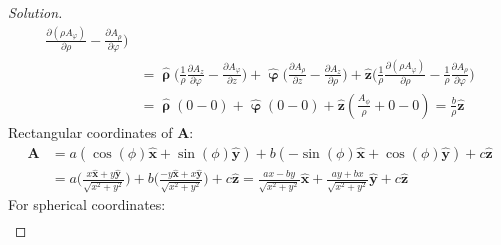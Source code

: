 \begin{proof}[Solution]
\begin{align*}
                        \frac{\partial(\rho{A_{\varphi}})}
                             {\partial\rho}
                        -\frac{\partial{A_{\rho}}}
                              {\partial\varphi}
                    \bigg)\\
                    &=\hat{\boldsymbol{\uprho}}\bigg(
                        \frac{1}{\rho}
                        \frac{\partial{A_{z}}}{\partial\varphi}
                        -\frac{\partial{A_{\varphi}}}
                              {\partial{z}}
                    \bigg)
                    +\hat{\boldsymbol{\upvarphi}}\bigg(
                        \frac{\partial{A_{\rho}}}{\partial{z}}
                        -\frac{\partial{A_{z}}}{\partial\rho}
                    \bigg)
                    +\hat{\mathbf{z}}\bigg(
                        \frac{1}{\rho}
                        \frac{\partial(\rho{A_{\varphi}})}
                             {\partial\rho}
                        -\frac{1}{\rho}
                        \frac{\partial{A_{\rho}}}
                             {\partial\varphi}
                    \bigg)\\
                    &=\hat{\boldsymbol{\uprho}}(0-0)
                     +\hat{\boldsymbol{\upvarphi}}(0-0)
                     +\hat{\mathbf{z}}(\frac{A_{\phi}}{\rho}+0-0)
                     =\frac{b}{\rho}\hat{\mathbf{z}}
                \end{align*}
                Rectangular coordinates of $\mathbf{A}$:
                \begin{align*}
                    \mathbf{A}
                    &=a(\cos(\phi)\hat{\mathbf{x}}
                    +\sin(\phi)\hat{\mathbf{y}})
                    +b(-\sin(\phi)\hat{\mathbf{x}}
                    +\cos(\phi)\hat{\mathbf{y}})
                    +c\hat{\mathbf{z}}\\
                    &=a\bigg(
                        \frac{x\hat{\mathbf{x}}
                        +y\hat{\mathbf{y}}}{\sqrt{x^{2}+y^{2}}}
                    \bigg)
                    +b\bigg(
                        \frac{-y\hat{\mathbf{x}}
                        +x\hat{\mathbf{y}}}{\sqrt{x^{2}+y^{2}}}
                    \bigg)
                    +c\hat{\mathbf{z}}
                    =\frac{ax-by}{\sqrt{x^{2}+y^{2}}}\hat{\mathbf{x}}
                    +\frac{ay+bx}{\sqrt{x^{2}+y^{2}}}\hat{\mathbf{y}}
                    +c\hat{\mathbf{z}}
                \end{align*}
                For spherical coordinates:
                \begin{align*}

\end{align*}
\end{proof}
